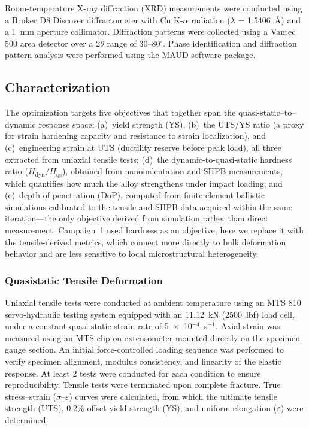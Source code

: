 Room-temperature X-ray diffraction (XRD) measurements were conducted using a Bruker D8 Discover diffractometer with Cu K-$\alpha$ radiation ($\lambda$ = 1.5406~\AA) and a 1~mm aperture collimator. Diffraction patterns were collected using a Vantec 500 area detector over a 2$\theta$ range of 30--80$^\circ$. Phase identification and diffraction pattern analysis were performed using the MAUD software package.

\subsection{Characterization}

The optimization targets five objectives that together span the quasi-static--to--dynamic response space: (a)~yield strength (YS), (b)~the UTS/YS ratio (a proxy for strain hardening capacity and resistance to strain localization), and (c)~engineering strain at UTS (ductility reserve before peak load), all three extracted from uniaxial tensile tests; (d)~the dynamic-to-quasi-static hardness ratio ($H_\text{dyn}/H_\text{qs}$), obtained from nanoindentation and SHPB measurements, which quantifies how much the alloy strengthens under impact loading; and (e)~depth of penetration (DoP), computed from finite-element ballistic simulations calibrated to the tensile and SHPB data acquired within the same iteration---the only objective derived from simulation rather than direct measurement. Campaign~1 used hardness as an objective; here we replace it with the tensile-derived metrics, which connect more directly to bulk deformation behavior and are less sensitive to local microstructural heterogeneity.

\subsubsection{Quasistatic Tensile Deformation}

Uniaxial tensile tests were conducted at ambient temperature using an MTS 810 servo-hydraulic testing system equipped with an 11.12~kN (2500~lbf) load cell, under a constant quasi-static strain rate of 5~$\times$~10$^{-4}$~s$^{-1}$. Axial strain was measured using an MTS clip-on extensometer mounted directly on the specimen gauge section. An initial force-controlled loading sequence was performed to verify specimen alignment, modulus consistency, and linearity of the elastic response. At least 2 tests were conducted for each condition to ensure reproducibility. Tensile tests were terminated upon complete fracture. True stress--strain ($\sigma$--$\varepsilon$) curves were calculated, from which the ultimate tensile strength (UTS), 0.2\% offset yield strength (YS), and uniform elongation ($\varepsilon$) were determined.

